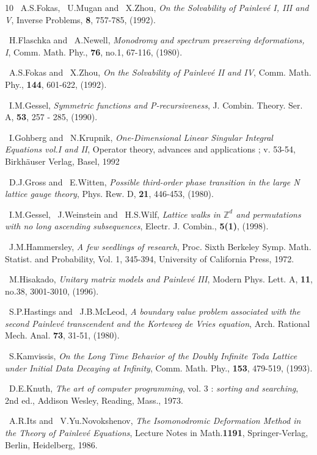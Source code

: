 \documentclass{amsart}
\theoremstyle{definition}
\theoremstyle{remark}
\numberwithin{equation}{section}
\begin{document}
\begin{thebibliography}{10}
~A.S.Fokas, ~U.Mugan and ~X.Zhou, \emph{On the Solvability of Painlev\'e I, III
and V}, Inverse Problems, \textbf{8}, 757-785, (1992).

~H.Flaschka and ~A.Newell, \emph{Monodromy and spectrum preserving 
deformations, I}, Comm. Math. Phy., \textbf{76}, no.1, 67-116, (1980).

~A.S.Fokas and ~X.Zhou, \emph{On the Solvability of Painlev\'e II and IV}, 
Comm. Math. Phy., \textbf{144}, 601-622, (1992).

~I.M.Gessel, \emph{Symmetric functions and P-recursiveness}, 
J. Combin. Theory. Ser. A, {\bf 53}, 257 - 285, (1990).

~I.Gohberg and ~N.Krupnik, \emph{One-Dimensional Linear Singular 
Integral Equations vol.I and II}, Operator theory, advances 
and applications ;  v. 53-54, Birkh\"auser Verlag, Basel, 1992

~D.J.Gross and ~E.Witten, \emph{Possible third-order phase transition 
in the large N lattice gauge theory}, Phys. Rew. D, \textbf{21}, 
446-453, (1980).

~I.M.Gessel, ~J.Weinstein and ~H.S.Wilf, \emph{Lattice walks in
$\mathbb Z^d$ and permutations with no long ascending subsequences},
Electr. J. Combin., {\bf 5(1)}, (1998).

~J.M.Hammersley, \emph{A few seedlings of research}, Proc. Sixth
Berkeley Symp. Math. Statist. and Probability, Vol. 1,
345-394, University of California Press, 1972.

~M.Hisakado, \emph{Unitary matrix models and Painlev\'e III}, 
Modern Phys. Lett. A, \textbf{11}, no.38, 3001-3010, (1996).

~S.P.Hastings and ~J.B.McLeod, \emph{A boundary value problem
associated with the second Painlev\'e transcendent and
the Korteweg de Vries equation}, Arch. Rational Mech. Anal.
\textbf{73}, 31-51, (1980).

~S.Kamvissis, \emph{On the Long Time Behavior of the Doubly Infinite 
Toda Lattice under Initial Data Decaying at Infinity}, 
Comm. Math. Phy., \textbf{153}, 479-519, (1993).

~D.E.Knuth, \emph{The art of computer programming},
vol. 3 : \emph{sorting and searching},
2nd ed., Addison Wesley, Reading, Mass., 1973.

~A.R.Its and ~V.Yu.Novokshenov, \emph{The Isomonodromic Deformation 
Method in the Theory of Painlev\'e Equations}, Lecture Notes 
in Math.\textbf{1191}, Springer-Verlag, Berlin, Heidelberg, 1986.


\end{thebibliography}
\end{document}
